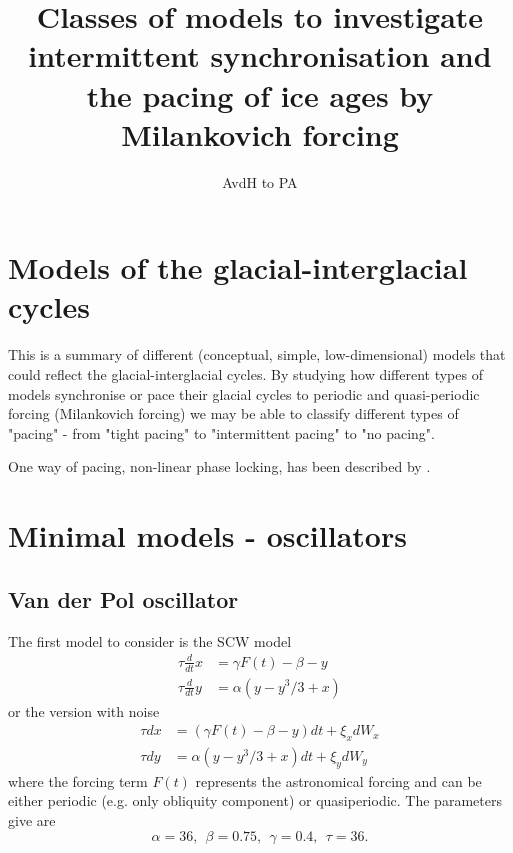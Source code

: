 \documentclass[12pt]{article}
\begin{document}
\title{Classes of models to investigate intermittent synchronisation and the pacing of ice ages by Milankovich forcing}


\author{AvdH to PA}


\maketitle

\section{Models of the glacial-interglacial cycles}
This is a summary of different (conceptual, simple, low-dimensional) models that could reflect the glacial-interglacial cycles. By studying how different types of models synchronise or pace their glacial cycles to periodic and quasi-periodic forcing (Milankovich forcing) we may be able to classify different types of "pacing" - from "tight pacing" to "intermittent pacing" to "no pacing".

One way of pacing, non-linear phase locking, has been described by \cite{Tziperman:2006he}. 

\section{Minimal models - oscillators}

\subsection{Van der Pol oscillator}
The first model to consider is the SCW \cite{DeSaedeleer:2013dk} model
\begin{align}
\tau \frac{d}{dt} x & = \gamma F(t)-\beta-y\\
\tau \frac{d}{dt} y & = \alpha(y-y^3/3+x)
\label{e:SCW}
\end{align}
or the version with noise
\begin{align}
\tau dx & = (\gamma F(t)-\beta-y)dt+\xi_x dW_x\\
\tau dy & = \alpha(y-y^3/3+x) dt + \xi_y dW_y
\label{e:SCWnoise}
\end{align}
where the forcing term $F(t)$ represents the astronomical forcing and can be either periodic (e.g. only obliquity component) or quasiperiodic. The parameters \cite{DeSaedeleer:2013dk} give are
\begin{equation}
\alpha=36,~~\beta=0.75,~~\gamma=0.4,~~\tau=36.
\end{equation}
\end{document}
